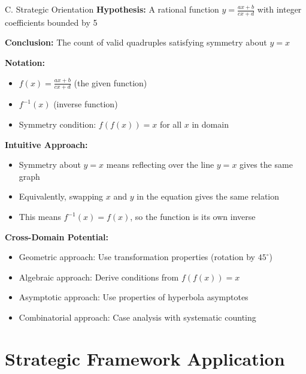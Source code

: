 \documentclass[12pt]{article}
\begin{document}
\begin{configbox}{C. Strategic Orientation}
\textbf{Hypothesis:} A rational function $y = \frac{ax+b}{cx+d}$ with integer coefficients bounded by 5

\textbf{Conclusion:} The count of valid quadruples satisfying symmetry about $y=x$

\textbf{Notation:}
\begin{itemize}
    \item $f(x) = \frac{ax+b}{cx+d}$ (the given function)
    \item $f^{-1}(x)$ (inverse function)
    \item Symmetry condition: $f(f(x)) = x$ for all $x$ in domain
\end{itemize}

\textbf{Intuitive Approach:} 
\begin{itemize}
    \item Symmetry about $y=x$ means reflecting over the line $y=x$ gives the same graph
    \item Equivalently, swapping $x$ and $y$ in the equation gives the same relation
    \item This means $f^{-1}(x) = f(x)$, so the function is its own inverse
\end{itemize}

\textbf{Cross-Domain Potential:}
\begin{itemize}
    \item Geometric approach: Use transformation properties (rotation by $45^\circ$)
    \item Algebraic approach: Derive conditions from $f(f(x)) = x$
    \item Asymptotic approach: Use properties of hyperbola asymptotes
    \item Combinatorial approach: Case analysis with systematic counting
\end{itemize}
\end{configbox}

\section{Strategic Framework Application}
\end{document}
